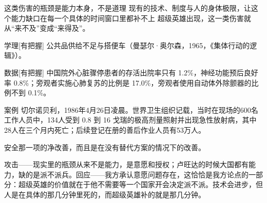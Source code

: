 \documentclass[prep,both]{debate}
\begin{document}
\begin{fields}
\begin{mechanism}[机制]
\step 这类伤害的瓶颈是能力本身，不是道理
\step 现有的技术、制度与人的身体极限，让这个能力缺口在每一个具体的时间窗口里都补不上
\step 超级英雄出现，这一类伤害就从“来不及”变成“来得及”。

\end{mechanism}
\begin{evidence}{学理}[有把握]
公共品供给不足与搭便车（曼瑟尔·奥尔森，1965，《集体行动的逻辑》）。
\end{evidence}
\begin{evidence}{数据}[有把握]
中国院外心脏骤停患者的存活出院率只有 1.2\%，神经功能预后良好率 0.8\%；旁观者实施心肺复苏的比例是 17.0\%，旁观者使用自动体外除颤器的比例不到 0.1\%。
\end{evidence}
\begin{evidence}{案例}
切尔诺贝利，1986年4月26日凌晨。世界卫生组织记载，当时在现场的600名工作人员中，134人受到 0.8 到 16 戈瑞的极高剂量照射并出现急性放射病，其中28人在三个月内死亡；后续登记在册的善后作业人员有53万人。
\end{evidence}
\closing[回扣判准]{安全那一项的净改善，而且是在没有替代方案的情况下的改善。}
\begin{clash}
攻击——现实里的瓶颈从来不是能力，是意愿和授权；卢旺达的时候大国都有能力，缺的是派不派兵。回应——我方承认意愿问题存在，这恰恰是我方论点的一部分：超级英雄的价值就在于他不需要等一个国家开会决定派不派。技术会进步，但人是在具体的那几分钟里死的，而超级英雄补的就是那几分钟。
\end{clash}
\end{fields}
\end{document}
